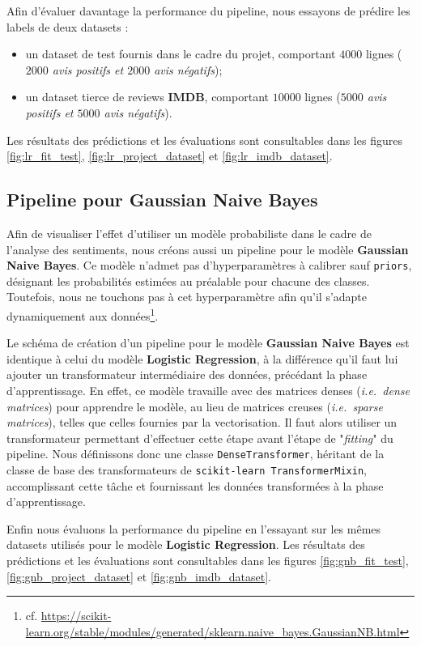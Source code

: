 \documentclass[12pt,a4paper]{report}
\theoremstyle{definition}
\begin{document}
Afin d'évaluer davantage la performance du pipeline, nous essayons de prédire les labels de deux datasets :
\begin{itemize}
  \item un dataset de test fournis dans le cadre du projet, comportant $4000$ lignes (\emph{$2000$ avis positifs et $2000$ avis négatifs});
  \item un dataset tierce de reviews \textbf{IMDB}, comportant $10000$ lignes (\emph{$5000$ avis positifs et $5000$ avis négatifs}).
\end{itemize}

Les résultats des prédictions et les évaluations sont consultables dans les figures \ref{fig:lr_fit_test}, \ref{fig:lr_project_dataset} et \ref{fig:lr_imdb_dataset}.

\subsection{Pipeline pour Gaussian Naive Bayes}
Afin de visualiser l'effet d'utiliser un modèle probabiliste dans le cadre de l'analyse des sentiments, nous créons aussi un pipeline pour le modèle \textbf{Gaussian Naive Bayes}. Ce modèle n'admet pas d'hyperparamètres à calibrer sauf \texttt{priors}, désignant les probabilités estimées au préalable pour chacune des classes. Toutefois, nous ne touchons pas à cet hyperparamètre afin qu’il s’adapte dynamiquement aux données\footnote{cf. \url{https://scikit-learn.org/stable/modules/generated/sklearn.naive_bayes.GaussianNB.html}}.

Le schéma de création d'un pipeline pour le modèle \textbf{Gaussian Naive Bayes} est identique à celui du modèle \textbf{Logistic Regression}, à la différence qu'il faut lui ajouter un transformateur intermédiaire des données, précédant la phase d'apprentissage. En effet, ce modèle travaille avec des matrices denses (\emph{i.e.~dense matrices}) pour apprendre le modèle, au lieu de matrices creuses (\emph{i.e.~sparse matrices}), telles que celles fournies par la vectorisation. Il faut alors utiliser un transformateur permettant d’effectuer cette étape avant l’étape de "\textit{fitting}" du pipeline. Nous définissons donc une classe \texttt{DenseTransformer}, héritant de la classe de base des transformateurs de \texttt{scikit-learn TransformerMixin}, accomplissant cette tâche et fournissant les données transformées à la phase d’apprentissage.

Enfin nous évaluons la performance du pipeline en l'essayant sur les mêmes datasets utilisés pour le modèle \textbf{Logistic Regression}. Les résultats des prédictions et les évaluations sont consultables dans les figures \ref{fig:gnb_fit_test}, \ref{fig:gnb_project_dataset} et \ref{fig:gnb_imdb_dataset}.
\end{document}
